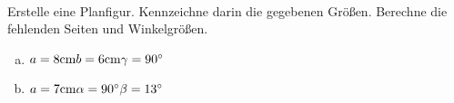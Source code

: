 \begin{aufgabe} ~ \\ 
Erstelle eine Planfigur. Kennzeichne darin die gegebenen Größen. Berechne die fehlenden Seiten und Winkelgrößen.\begin{enumerate}[a)] 
\item 
$a=8 \mathrm{cm} \\b=6 \mathrm{cm} \\\gamma=90^{\circ} \\$
\item 
$a=7 \mathrm{cm} \\\alpha=90^{\circ} \\\beta=13^{\circ} \\$
\end{enumerate} 
\end{aufgabe} 
